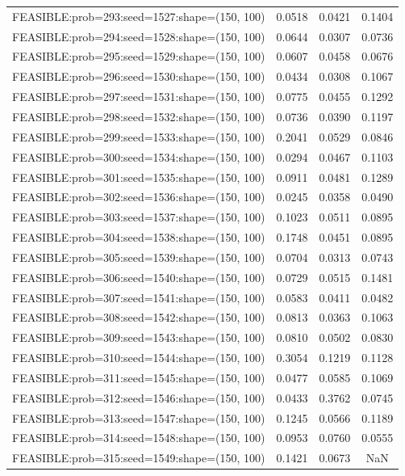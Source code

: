 \begin{longtable}{lccc}
FEASIBLE:prob=293:seed=1527:shape=(150, 100) & 0.0518 & 0.0421 & 0.1404 \\
FEASIBLE:prob=294:seed=1528:shape=(150, 100) & 0.0644 & 0.0307 & 0.0736 \\
FEASIBLE:prob=295:seed=1529:shape=(150, 100) & 0.0607 & 0.0458 & 0.0676 \\
FEASIBLE:prob=296:seed=1530:shape=(150, 100) & 0.0434 & 0.0308 & 0.1067 \\
FEASIBLE:prob=297:seed=1531:shape=(150, 100) & 0.0775 & 0.0455 & 0.1292 \\
FEASIBLE:prob=298:seed=1532:shape=(150, 100) & 0.0736 & 0.0390 & 0.1197 \\
FEASIBLE:prob=299:seed=1533:shape=(150, 100) & 0.2041 & 0.0529 & 0.0846 \\
FEASIBLE:prob=300:seed=1534:shape=(150, 100) & 0.0294 & 0.0467 & 0.1103 \\
FEASIBLE:prob=301:seed=1535:shape=(150, 100) & 0.0911 & 0.0481 & 0.1289 \\
FEASIBLE:prob=302:seed=1536:shape=(150, 100) & 0.0245 & 0.0358 & 0.0490 \\
FEASIBLE:prob=303:seed=1537:shape=(150, 100) & 0.1023 & 0.0511 & 0.0895 \\
FEASIBLE:prob=304:seed=1538:shape=(150, 100) & 0.1748 & 0.0451 & 0.0895 \\
FEASIBLE:prob=305:seed=1539:shape=(150, 100) & 0.0704 & 0.0313 & 0.0743 \\
FEASIBLE:prob=306:seed=1540:shape=(150, 100) & 0.0729 & 0.0515 & 0.1481 \\
FEASIBLE:prob=307:seed=1541:shape=(150, 100) & 0.0583 & 0.0411 & 0.0482 \\
FEASIBLE:prob=308:seed=1542:shape=(150, 100) & 0.0813 & 0.0363 & 0.1063 \\
FEASIBLE:prob=309:seed=1543:shape=(150, 100) & 0.0810 & 0.0502 & 0.0830 \\
FEASIBLE:prob=310:seed=1544:shape=(150, 100) & 0.3054 & 0.1219 & 0.1128 \\
FEASIBLE:prob=311:seed=1545:shape=(150, 100) & 0.0477 & 0.0585 & 0.1069 \\
FEASIBLE:prob=312:seed=1546:shape=(150, 100) & 0.0433 & 0.3762 & 0.0745 \\
FEASIBLE:prob=313:seed=1547:shape=(150, 100) & 0.1245 & 0.0566 & 0.1189 \\
FEASIBLE:prob=314:seed=1548:shape=(150, 100) & 0.0953 & 0.0760 & 0.0555 \\
FEASIBLE:prob=315:seed=1549:shape=(150, 100) & 0.1421 & 0.0673 &    NaN \\

\end{longtable}
